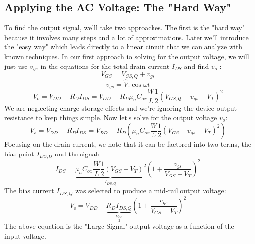 \subsection{Applying the AC Voltage:  The "Hard Way"}
To find the output signal, we'll take two approaches.  The first is the "hard way" because it involves many steps and a lot of approximations.  Later we'll introduce the "easy way" which leads directly to a linear circuit that we can analyze with known techniques.  
In our first approach to solving for the output voltage, we will just use $v_{gs}$ in the equations for the total drain current $I_{DS}$  and find $v_o$ :
    \begin{equation}
        {V_{GS}} = {V_{GS,Q}} + {v_{gs}}
    \end{equation}
    \begin{equation}
        v_{gs} = {\hat V_s}\cos \omega t
    \end{equation}
    \begin{equation}
        {V_o} = {V_{DD}} - {R_D}{I_{DS}} = {V_{DD}} - {R_D}{\mu _n}{C_{ox}}\frac{W}{L}\frac{1}{2}{({V_{GS,Q}} + {v_{gs}} - {V_T})^2}
    \end{equation}
We are neglecting charge storage effects and we're ignoring the device output resistance to keep things simple.  Now let's solve for the output voltage $v_o$:
    \begin{equation}
        {V_o} = {V_{DD}} - {R_D}{I_{DS}} = {V_{DD}} - {R_D}\left( {\mu _n}{C_{ox}}\frac{W}{L}\frac{1}{2}{({V_{GS}} + {v_{gs}} - {V_T})^2} \right)
    \end{equation}
Focusing on the drain current, we note that it can be factored into two terms, the bias point $I_{DS,Q}$ and the signal:
    \begin{equation}
        I_{DS} = \underbrace{{\mu _n}{C_{ox}}\frac{W}{L}\frac{1}{2}{({V_{GS}} - {V_T})^2}}_{I_{DS,Q}}{\left( {1 + \frac{{{v_{gs}}}}{{{V_{GS}} - {V_T}}}} \right)^2}
    \end{equation}
The bias current $I_{DS,Q}$ was selected to produce a mid-rail output voltage:
    \begin{equation}
        {V_o} = {V_{DD}} - \underbrace{ {R_D}{I_{DS,Q}}}_{\frac{V_{DD}}{2}}{\left( {1 + \frac{{{v_{gs}}}}{{{V_{GS}} - {V_T}}}} \right)^2}
    \end{equation}
The above equation is the "Large Signal" output voltage as a function of the input voltage.
